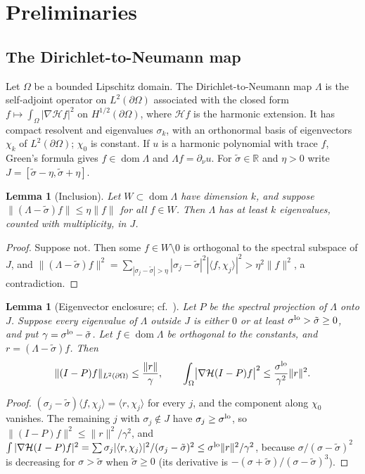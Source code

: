 \documentclass[11pt]{article}
\newtheorem{lemma}[theorem]{Lemma}
\theoremstyle{definition}
\theoremstyle{remark}
\newcommand{\R}{\mathbb{R}}
\newcommand{\Lam}{\Lambda}
\begin{document}
\section{Preliminaries}

\subsection{The Dirichlet-to-Neumann map}
Let $\Omega$ be a bounded Lipschitz domain. The Dirichlet-to-Neumann map $\Lam$ is the self-adjoint
operator on $L^2(\partial\Omega)$ associated with the closed form $f\mapsto\int_\Omega|\nabla\mathcal Hf|^2$ on
$H^{1/2}(\partial\Omega)$, where $\mathcal Hf$ is the harmonic extension. It has compact resolvent and eigenvalues
$\sigma_k$, with an orthonormal basis of eigenvectors $\chi_k$ of $L^2(\partial\Omega)$; $\chi_0$ is
constant. If $u$ is a harmonic polynomial with trace $f$, Green's formula gives $f\in\operatorname{dom}\Lam$ and
$\Lam f=\partial_\nu u$. For $\tilde\sigma\in\R$ and $\eta>0$ write $J=[\tilde\sigma-\eta,\tilde\sigma+\eta]$.

\begin{lemma}[Inclusion]\label{lem:incl}
Let $W\subset\operatorname{dom}\Lam$ have dimension $k$, and suppose $\|(\Lam-\tilde\sigma)f\|\le\eta\|f\|$ for all
$f\in W$. Then $\Lam$ has at least $k$ eigenvalues, counted with multiplicity, in $J$.
\end{lemma}
\begin{proof}
Suppose not. Then some $f\in W\setminus0$ is orthogonal to the spectral subspace of $J$, and
$\|(\Lam-\tilde\sigma)f\|^2=\sum_{|\sigma_j-\tilde\sigma|>\eta}|\sigma_j-\tilde\sigma|^2|\langle f,\chi_j\rangle|^2>\eta^2\|f\|^2$,
a contradiction.
\end{proof}

\begin{lemma}[Eigenvector enclosure; cf.~\cite{DK}]\label{lem:enclosure}
Let $P$ be the spectral projection of $\Lam$ onto $J$. Suppose every eigenvalue of $\Lam$ outside $J$ is
either $0$ or at least $\sigma^{\rm lo}>\tilde\sigma\ge0$, and put $\gamma=\sigma^{\rm lo}-\tilde\sigma$. Let
$f\in\operatorname{dom}\Lam$ be orthogonal to the constants, and $r=(\Lam-\tilde\sigma)f$. Then
\[\|(I-P)f\|_{L^2(\partial\Omega)}\le\frac{\|r\|}{\gamma},\qquad
\int_\Omega\bigl|\nabla\mathcal H(I-P)f\bigr|^2\le\frac{\sigma^{\rm lo}}{\gamma^2}\|r\|^2.\]
\end{lemma}
\begin{proof}
$(\sigma_j-\tilde\sigma)\langle f,\chi_j\rangle=\langle r,\chi_j\rangle$ for every $j$, and the component along
$\chi_0$ vanishes. The remaining $j$ with $\sigma_j\notin J$ have $\sigma_j\ge\sigma^{\rm lo}$, so
$\|(I-P)f\|^2\le\|r\|^2/\gamma^2$, and
$\int|\nabla\mathcal H(I-P)f|^2=\sum\sigma_j|\langle r,\chi_j\rangle|^2/(\sigma_j-\tilde\sigma)^2\le\sigma^{\rm lo}\|r\|^2/\gamma^2$,
because $\sigma/(\sigma-\tilde\sigma)^2$ is decreasing for $\sigma>\tilde\sigma$ when $\tilde\sigma\ge0$ (its derivative is $-(\sigma+\tilde\sigma)/(\sigma-\tilde\sigma)^3$).
\end{proof}
\end{document}
